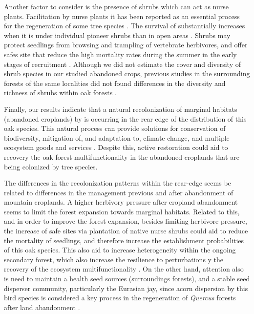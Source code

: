 Another factor to consider is the presence of shrubs which can act as nurse plants. Facilitation by nurse plants it has been reported as an essential process for the regeneration of some tree species  \autocites{Castroetal2006RestoringQuercus,GomezAparicioetal2004ApplyingPlant}. The survival of \Qp substantially increases when it is under individual pioneer shrubs than in open areas \autocite{Castroetal2006RestoringQuercus,Costaetal2017CanNative}. Shrubs may protect \Qp seedlings from browsing and trampling of vertebrate herbivores, and offer safes site that reduce the high mortality rates during the summer in the early stages of recruitment \autocites{Castroetal2006RestoringQuercus,Barazaetal2004HerbivoryHas}. Although we did not estimate the cover and diversity of shrub species in our studied abandoned crops, previous studies in the surrounding forests of the same localities did not found differences in the diversity and richness of shrubs within oak forests \autocite{Munoz2014BosquesAutoctonos}. 

Finally, our results indicate that a natural recolonization of marginal habitats (abandoned croplands) by \Qp is occurring in the rear edge of the distribution of this oak species. This natural process can provide solutions for conservation of biodiversity, mitigation of, and adaptation to, climate change, and multiple ecosystem goods and services \autocites[][and references therein]{Chazdonetal2020FosteringNatural}. Despite this, active restoration could aid to recovery the oak forest multifunctionality \autocite{CruzAlonsoetal2019LongTerm} in the abandoned croplands that are being colonized by tree species. 

The differences in the recolonization patterns within the rear-edge seems be related to differences in the management previous and after abandonment of mountain croplands. A higher herbivory pressure after cropland abandonment seems to limit the forest expansion towards marginal habitats. Related to this, and in order to improve the forest expansion, besides limiting herbivore pressure, the increase of safe sites via plantation of native nurse shrubs could aid to reduce the mortality of \Qp seedlings, and therefore increase the establishment probabilities of this oak species. This also aid to increase heterogeneity within the ongoing secondary forest, which also increase the resilience to perturbations y the recovery of the ecosystem multifunctionality \autocites{Stritihetal2021ImpactLanduse, CruzAlonsoetal2019LongTerm}. On the other hand, attention also is need to maintain a health seed sources (surroundings forests), and a stable seed disperser community, particularly the Eurasian jay, since acorn dispersion by this bird species is considered a key process in the regeneration of \emph{Quercus} forests after land abandonment \autocite{Pausasetal2006RegenerationMarginal}. 

